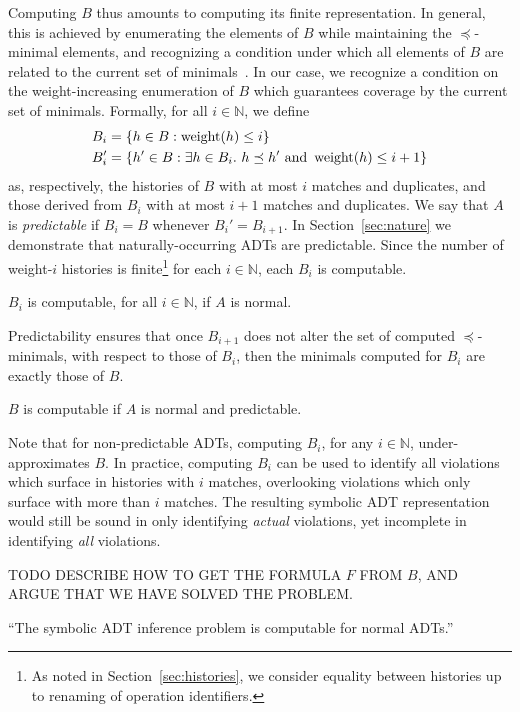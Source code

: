 Computing $B$ thus amounts to computing its finite representation. In general,
this is achieved by enumerating the elements of $B$ while maintaining the
$\preceq$-minimal elements, and recognizing a condition under which all
elements of $B$ are related to the current set of
minimals~\cite{conf/lics/AbdullaCJT96, journals/tcs/FinkelS01}. In our case, we
recognize a condition on the weight-increasing enumeration of $B$ which
guarantees coverage by the current set of minimals. Formally, for all $i \in
\mathbb{N}$, we define
\begin{align*}
  B_i &= {\{{ h \in B : \operatorname{weight}(h) \le i }\}} \\
  B_i' &= {\{{ h' \in B :
    \exists h \in B_i.\ h \preceq h' \text{ and } \operatorname{weight}(h) \le i+1
  }\}}
\end{align*}
as, respectively, the histories of $B$ with at most $i$ matches and duplicates,
and those derived from $B_i$ with at most $i\!+\!1$ matches and duplicates. We
say that $A$ is \emph{predictable} if $B_i = B$ whenever $B_i' = B_{i+1}$. In
Section~\ref{sec:nature} we demonstrate that naturally-occurring ADTs are
predictable. Since the number of weight-$i$ histories is finite\footnote{As
noted in Section~\ref{sec:histories}, we consider equality between histories up
to renaming of operation identifiers.} for each $i \in \mathbb{N}$, each $B_i$
is computable.

\begin{lemma}

  $B_i$ is computable, for all $i \in \mathbb{N}$, if $A$ is normal.

\end{lemma}

Predictability ensures that once $B_{i+1}$ does not alter the set of computed
$\preceq$-minimals, with respect to those of $B_i$, then the minimals computed
for $B_i$ are exactly those of $B$.

\begin{lemma}

  $B$ is computable if $A$ is normal and predictable.

\end{lemma}

Note that for non-predictable ADTs, computing $B_i$, for any $i \in
\mathbb{N}$, under-approximates $B$. In practice, computing $B_i$ can be used
to identify all violations which surface in histories with $i$ matches,
overlooking violations which only surface with more than $i$ matches. The
resulting symbolic ADT representation would still be sound in only identifying
\emph{actual} violations, yet incomplete in identifying \emph{all} violations.

TODO DESCRIBE HOW TO GET THE FORMULA $F$ FROM $B$, AND ARGUE THAT WE HAVE
SOLVED THE PROBLEM.

\begin{theorem}

  “The symbolic ADT inference problem is computable for normal ADTs.”

\end{theorem}
